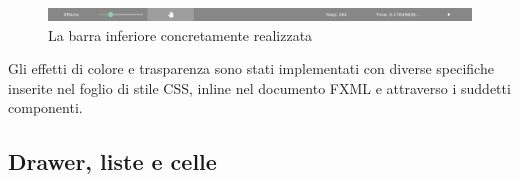             \begin{figure}[htbp]
                \centering
                \includegraphics[scale=0.45]{img/NewBar}
                \caption{La barra inferiore concretamente realizzata}
                \label{fig:newBar}
            \end{figure}

            Gli effetti di colore e trasparenza sono stati implementati con diverse specifiche inserite nel foglio di stile CSS, inline nel documento FXML e attraverso i suddetti componenti.

        \subsection{Drawer, liste e celle}\label{subsec:drawerCelle}
